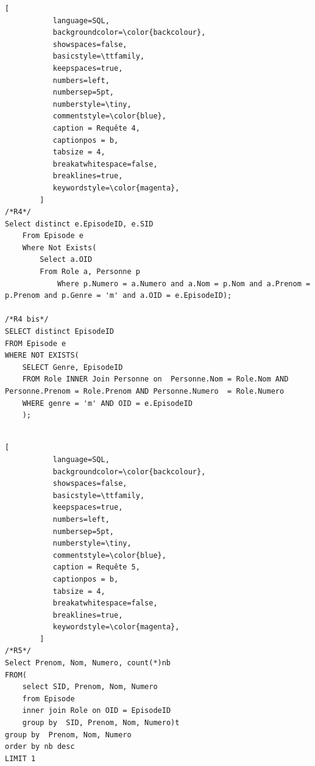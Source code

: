\documentclass[10pt,a4paper]{article}
\begin{document}
\begin{lstlisting}[
           language=SQL,
           backgroundcolor=\color{backcolour},
           showspaces=false,
           basicstyle=\ttfamily,
           keepspaces=true,                 
           numbers=left,                    
           numbersep=5pt,
           numberstyle=\tiny,
           commentstyle=\color{blue},
           caption = Requête 4,
           captionpos = b,
           tabsize = 4,
           breakatwhitespace=false,         
    	   breaklines=true,
           keywordstyle=\color{magenta},
        ]
/*R4*/
Select distinct e.EpisodeID, e.SID 
	From Episode e 
    Where Not Exists( 
        Select a.OID 
        From Role a, Personne p 
        	Where p.Numero = a.Numero and a.Nom = p.Nom and a.Prenom = p.Prenom and p.Genre = 'm' and a.OID = e.EpisodeID);

/*R4 bis*/
SELECT distinct EpisodeID
FROM Episode e
WHERE NOT EXISTS(
	SELECT Genre, EpisodeID
	FROM Role INNER Join Personne on  Personne.Nom = Role.Nom AND Personne.Prenom = Role.Prenom AND Personne.Numero  = Role.Numero
	WHERE genre = 'm' AND OID = e.EpisodeID
    );
    
\end{lstlisting}
\newpage
\begin{lstlisting}[
           language=SQL,
           backgroundcolor=\color{backcolour},
           showspaces=false,
           basicstyle=\ttfamily,
           keepspaces=true,                 
           numbers=left,                    
           numbersep=5pt,
           numberstyle=\tiny,
           commentstyle=\color{blue},
           caption = Requête 5,
           captionpos = b,
           tabsize = 4,
           breakatwhitespace=false,         
    	   breaklines=true,
           keywordstyle=\color{magenta},
        ]
/*R5*/
Select Prenom, Nom, Numero, count(*)nb
FROM(
	select SID, Prenom, Nom, Numero
	from Episode
	inner join Role on OID = EpisodeID
	group by  SID, Prenom, Nom, Numero)t
group by  Prenom, Nom, Numero
order by nb desc
LIMIT 1
   
\end{lstlisting}
\end{document}
